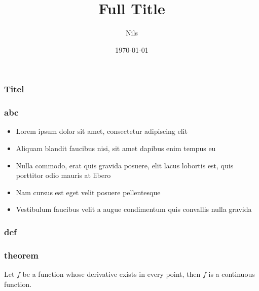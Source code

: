 \documentclass[10pt]{beamer}
\title[Short title]{Full Title}
\author{Nils}
\institute[UZH]
{
University of Zurich}
\date{\today}
\begin{document}
\begin{frame}
\titlepage
\end{frame}


\begin{frame}
\frametitle{Titel}
\end{frame}


\begin{frame}
\frametitle{abc}
\begin{itemize}
\item Lorem ipsum dolor sit amet, consectetur adipiscing elit
\item Aliquam blandit faucibus nisi, sit amet dapibus enim tempus eu
\item Nulla commodo, erat quis gravida posuere, elit lacus lobortis est, quis porttitor odio mauris at libero
\item Nam cursus est eget velit posuere pellentesque
\item Vestibulum faucibus velit a augue condimentum quis convallis nulla gravida
\end{itemize}
\end{frame}


\begin{frame}
\frametitle{def}
\end{frame}

\begin{frame}
\frametitle{theorem}
\begin{theorem}
	Let \(f\) be a function whose derivative exists in every point, then \(f\) 
is a continuous function.
\end{theorem}

\end{frame}
\end{document}
